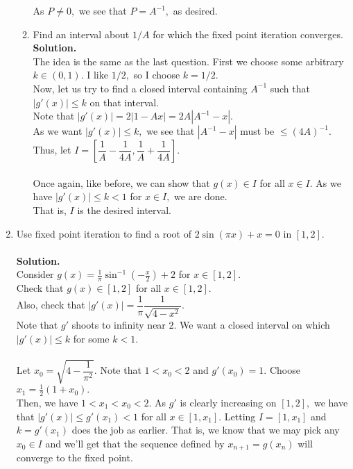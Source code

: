 \documentclass{article}
\begin{document}
\begin{enumerate}
\begin{enumerate}
		As $P \neq 0,$ we see that $P = A^{-1},$ as desired.\\
		\item Find an interval about $1/A$ for which the fixed point iteration converges.\\
		\textbf{Solution.}\\
		The idea is the same as the last question. First we choose some arbitrary $k \in (0, 1).$ I like $1/2,$ so I choose $k = 1/2.$\\
		Now, let us try to find a closed interval containing $A^{-1}$ such that $|g'(x)| \le k$ on that interval.\\
		Note that $|g'(x)| = 2|1 - Ax| = 2A|A^{-1} - x|.$\\
		As we want $|g'(x)| \le k,$ we see that $|A^{-1} - x|$ must be $\le (4A)^{-1}.$ Thus, let $I = \left[\dfrac{1}{A} - \dfrac{1}{4A}, \dfrac{1}{A} + \dfrac{1}{4A}\right].$\\~\\
		Once again, like before, we can show that $g(x) \in I$ for all $x \in I.$ As we have $|g'(x)| \le k < 1$ for $x \in I,$ we are done.\\
		That is, $I$ is the desired interval.
	\end{enumerate}
	\item Use fixed point iteration to find a root of $2\sin(\pi x) + x = 0$ in $[1, 2].$\\~\\
	\textbf{Solution.}\\
	Consider $g(x) = \displaystyle\frac{1}{\pi}\sin^{-1}\left(-\frac{x}{2}\right) + 2$ for $x \in [1, 2].$\\
	Check that $g(x) \in [1, 2]$ for all $x \in [1, 2].$\\
	Also, check that $|g'(x)| = \dfrac{1}{\pi}\dfrac{1}{\sqrt{4 - x^2}}.$\\
	Note that $g'$ shoots to infinity near $2.$ We want a closed interval on which $|g'(x)| \le k$ for some $k < 1.$\\~\\
	Let $x_0 = \sqrt{4 - \dfrac{1}{\pi^2}}.$ Note that $1 < x_0 < 2$ and $g'(x_0) = 1.$ Choose $x_1 = \frac{1}{2}(1 + x_0).$\\
	Then, we have $1 < x_1 <x_0 < 2.$ As $g'$ is clearly increasing on $[1, 2],$ we have that $|g'(x)| \le g'(x_1) < 1$ for all $x \in [1, x_1].$ Letting $I = [1, x_1]$ and $k = g'(x_1)$ does the job as earlier. That is, we know that we may pick any $x_0 \in I$ and we'll get that the sequence defined by $x_{n+1} = g(x_n)$ will converge to the fixed point.

\end{enumerate}
\end{document}
